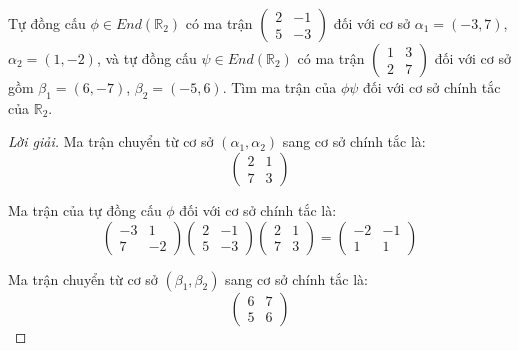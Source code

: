 \begin{exercise}
    Tự đồng cấu $\phi\in End(\mathbb{R}_{2})$ có ma trận $\begin{pmatrix} 2 & -1 \\ 5 & -3 \end{pmatrix}$ đối với cơ sở $\alpha_{1} = (-3, 7)$, $\alpha_{2} = (1, -2)$, và tự đồng cấu $\psi\in End(\mathbb{R}_{2})$ có ma trận $\begin{pmatrix} 1 & 3 \\ 2 & 7 \end{pmatrix}$ đối với cơ sở gồm $\beta_{1} = (6, -7)$, $\beta_{2} = (-5, 6)$. Tìm ma trận của $\phi\psi$ đối với cơ sở chính tắc của $\mathbb{R}_{2}$.
\end{exercise}

\begin{proof}[Lời giải]
    Ma trận chuyển từ cơ sở $(\alpha_{1}, \alpha_{2})$ sang cơ sở chính tắc là:
    \[
        \begin{pmatrix}
            2 & 1 \\
            7 & 3
        \end{pmatrix}
    \]
    
    Ma trận của tự đồng cấu $\phi$ đối với cơ sở chính tắc là:
    \[
        \begin{pmatrix}
            -3 & 1  \\
            7  & -2
        \end{pmatrix}
        \begin{pmatrix}
            2 & -1 \\
            5 & -3
        \end{pmatrix}
        \begin{pmatrix}
            2 & 1 \\
            7 & 3
        \end{pmatrix}=
        \begin{pmatrix}
            -2 & -1 \\
            1  & 1
        \end{pmatrix}
    \]
    
    Ma trận chuyển từ cơ sở $(\beta_{1}, \beta_{2})$ sang cơ sở chính tắc là:
    \[
        \begin{pmatrix}
            6 & 7 \\
            5 & 6
        \end{pmatrix}
    \]
    

\end{proof}
